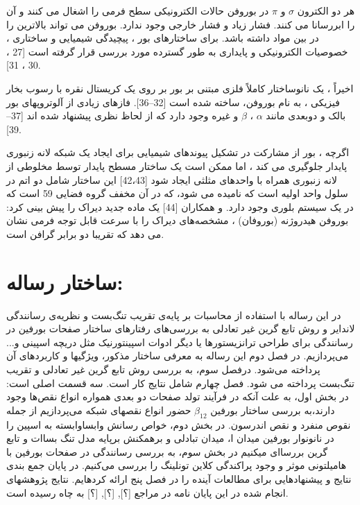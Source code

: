 هر دو الکترون $\sigma$ و $\pi$ در بوروفن حالات الکترونیکی سطح فرمی را اشغال می کنند و آن را ابررسانا می کنند. فشار زیاد و فشار خارجی وجود ندارد. بوروفن می تواند بالاترین  را در بین مواد  داشته باشد. برای ساختارهای بور ، پیچیدگی شیمیایی و ساختاری ، خصوصیات الکترونیکی و پایداری به طور گسترده مورد بررسی قرار گرفته است [27 ، 30 ، 31].

اخیراً ، یک نانوساختار کاملاً فلزی مبتنی بر بور بر روی یک کریستال نقره با رسوب بخار فیزیکی ، به نام بوروفن، ساخته شده است [32–36]. فازهای زیادی از آلوتروپهای بور بالک و دوبعدی مانند $\alpha$ ، $\beta$ و غیره وجود دارد که از لحاظ نظری پیشنهاد شده اند [37–39]. 

اگرچه ، بور از مشارکت در تشکیل پیوندهای شیمیایی برای ایجاد یک شبکه لانه زنبوری پایدار جلوگیری می کند ، اما ممکن است یک ساختار مسطح پایدار توسط مخلوطی از لانه زنبوری همراه با واحدهای مثلثی ایجاد شود [42،43] این ساختار شامل دو اتم در سلول واحد اولیه است که  نامیده می شود، که در آن  مخفف گروه فضایی 59 است که در یک سیستم بلوری  وجود دارد.  و همکاران [44] یک ماده جدید دیراک را پیش بینی کرد: بوروفن هیدروژنه (بوروفان) ، مشخصه‌های دیراک را با سرعت قابل توجه فرمی نشان می دهد که تقریبا دو برابر گرافن است.

\section{ساختار رساله:}
 در این رساله با استفاده از محاسبات بر پایه‌ی تقریب تنگ‌بست و نظریه‌ی  رسانندگی لانداير و روش تابع گرین غیر تعادلی به بررسی‌های
 رفتارهای ساختار صفحات بورفین در رسانندگی برای طراحی ترانزیستورها یا دیگر ادوات اسپینتورنیک مثل دریچه اسپینی و... می‌پردازیم. در فصل دوم 
 این رساله به معرفی ساختار مذکور، ویژگیها و کاربردهای آن  پرداخته می‌شود. درفصل سوم، به
 بررسی روش تابع گرین غیر تعادلی و تقریب تنگ‌بست پرداخته می شود.
 فصل چهارم شامل نتایج کار است. سه قسمت اصلی است: در بخش اول، به علت آنکه در فرآیند تولد صفحات دو بعدی همواره انواع نقص‌ها وجود دارند،به بررسی ساختار بورفین $\beta_{12}$ حضور
 انواع نقصهای شبکه می‌پردازیم از جمله نقوص منفرد و نقص اندرسون.  در بخش دوم، خواص رسانش وابساوابسته  به اسپین را در نانونوار بورفین میدان ا، میدان تبادلی و برهمكنش بر‌پایه مدل تنگ بساات و تابع گرین بررساای میکنیم در بخش سوم، به بررسی رسانندگی در صفحات بورفین با هامیلتونی موثر و وجود پراکندگی کلاین تونلینگ را بررسی می‌کنیم. در پایان جمع بندی نتایج و پیشنهادهایی برای مطالعات آینده را در فصل پنج ارائه کردهایم.
 نتایج پژوهشهای انجام شده در این پایان نامه در مراجع [؟], [؟], [؟] به چاه رسیده است.